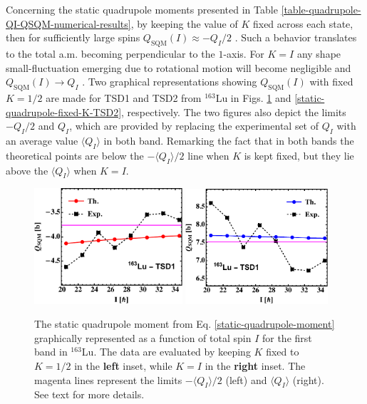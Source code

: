 Concerning the static quadrupole moments presented in Table \ref{table-quadrupole-QI-QSQM-numerical-results}, by keeping the value of $K$ fixed across each state, then for sufficiently large spins $Q_\text{SQM}(I)\approx -Q_I/2$ \cite{bohr1998nuclear}. Such a behavior translates to the total a.m. becoming perpendicular to the $1$-axis. For $K=I$ any shape small-fluctuation emerging due to rotational motion will become negligible and $Q_\text{SQM}(I) \to Q_I$ \cite{bohr1998nuclear}. Two graphical representations showing $Q_\text{SQM}(I)$ with fixed $K=1/2$ are made for TSD1 and TSD2 from $^{163}$Lu in Figs. \ref{static-quadrupole-fixed-K-TSD1} and \ref{static-quadrupole-fixed-K-TSD2}, respectively. The two figures also depict the limits $-Q_I/2$ and $Q_I$, which are provided by replacing the experimental set of $Q_I$ with an average value $\langle Q_I\rangle$ in both band. Remarking the fact that in both bands the theoretical points are below the $-\langle Q_I\rangle/2$ line when $K$ is kept fixed, but they lie above the $\langle Q_I \rangle $ when $K=I$.
\begin{figure}
    \centering
    \includegraphics[width=0.49\textwidth]{Chapters/Figures/Q_SQM_163Lu.pdf}
    \includegraphics[width=0.47\textwidth]{Chapters/Figures/Q_SQM_163Lu-2.pdf}
    \caption{The static quadrupole moment from Eq. \ref{static-quadrupole-moment} graphically represented as a function of total spin $I$ for the first band in $^{163}$Lu. The data are evaluated by keeping $K$ fixed to $K=1/2$ in the \textbf{left} inset, while $K=I$ in the \textbf{right} inset. The magenta lines represent the limits $-\langle Q_I\rangle/2$ (left) and $\langle Q_I\rangle$ (right). See text for more details.}
    \label{static-quadrupole-fixed-K-TSD1}
\end{figure}

